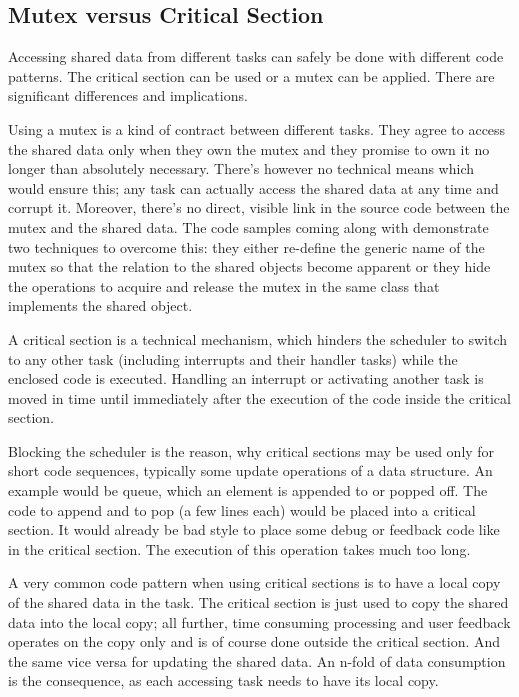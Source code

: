 \subsection{Mutex versus Critical Section}

Accessing shared data from different tasks can safely be done with
different code patterns. The critical section can be used or a mutex can
be applied. There are significant differences and implications.

Using a mutex is a kind of contract between different tasks. They agree to
access the shared data only when they own the mutex and they promise to
own it no longer than absolutely necessary. There's however no technical
means which would ensure this; any task can actually access the shared
data at any time and corrupt it. Moreover, there's no direct, visible link
in the source code between the mutex and the shared data. The code samples
coming along with \rtos{} demonstrate two techniques to overcome this:
they either re-define the generic name of the mutex so that the relation
to the shared objects become apparent or they hide the operations to
acquire and release the mutex in the same class that implements the shared
object.

A critical section is a technical mechanism, which hinders the scheduler to
switch to any other task (including interrupts and their handler tasks)
while the enclosed code is executed. Handling an interrupt or activating
another task is moved in time until immediately after the execution of the
code inside the critical section.  

Blocking the scheduler is the reason, why critical sections may be used
only for short code sequences, typically some update operations of a data
structure. An example would be queue, which an element is appended to or
popped off. The code to append and to pop (a few lines each) would be
placed into a critical section. It would already be bad style to place
some debug or feedback code like  in the critical section. The execution of this operation takes
much too long.

A very common code pattern when using critical sections is to have a local
copy of the shared data in the task. The critical section is just used to
copy the shared data into the local copy; all further, time consuming
processing and user feedback operates on the copy only and is of course
done outside the critical section. And the same vice versa for updating
the shared data. An n-fold of data consumption is the consequence, as each
accessing task needs to have its local copy.

